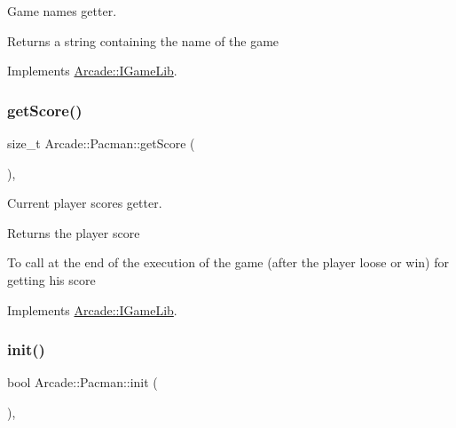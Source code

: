 Game name\textquotesingle{}s getter. 

\begin{DoxyReturn}{Returns}
a string containing the name of the game 
\end{DoxyReturn}


Implements \hyperlink{class_arcade_1_1_i_game_lib_afd2652d62ebfda4caa5d0c05ff40ed61}{Arcade\+::\+I\+Game\+Lib}.

\mbox{\label{class_arcade_1_1_pacman_a7683729dd33fb18673c4d77764ca1831}} 
\subsubsection{\texorpdfstring{get\+Score()}{getScore()}}
{\footnotesize\ttfamily size\+\_\+t Arcade\+::\+Pacman\+::get\+Score (\begin{DoxyParamCaption}{ }\end{DoxyParamCaption})\hspace{0.3cm}{\ttfamily [final]}, {\ttfamily [virtual]}}



Current player score\textquotesingle{}s getter. 

\begin{DoxyReturn}{Returns}
the player score
\end{DoxyReturn}
To call at the end of the execution of the game (after the player loose or win) for getting his score 

Implements \hyperlink{class_arcade_1_1_i_game_lib_a00cdcad68c670aecbcc249a2995833b6}{Arcade\+::\+I\+Game\+Lib}.

\mbox{\label{class_arcade_1_1_pacman_a27b0ecc843707c735ed1b65e7da009e1}} 
\subsubsection{\texorpdfstring{init()}{init()}}
{\footnotesize\ttfamily bool Arcade\+::\+Pacman\+::init (\begin{DoxyParamCaption}{ }\end{DoxyParamCaption})\hspace{0.3cm}{\ttfamily [final]}, {\ttfamily [virtual]}}



